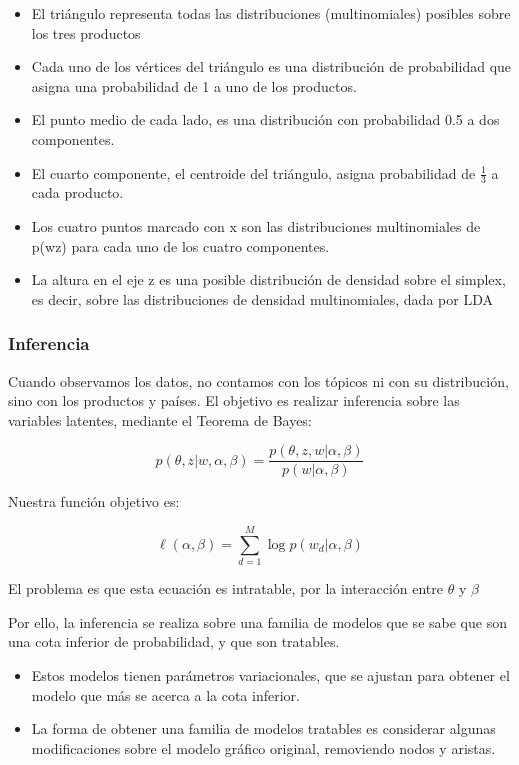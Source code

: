 \documentclass[class=article, crop=false]{standalone}
\begin{document}
\begin{itemize}
\item
El triángulo representa todas las distribuciones (multinomiales)
posibles sobre los tres productos
\item
Cada uno de los vértices del triángulo es una distribución de
probabilidad que asigna una probabilidad de 1 a uno de los productos.
\item
El punto medio de cada lado, es una distribución con probabilidad 0.5
a dos componentes.
\item
El cuarto componente, el centroide del triángulo, asigna probabilidad
de \(\frac{1}{3}\) a cada producto.
\item
Los cuatro puntos marcado con x son las distribuciones multinomiales
de p(w\textbar{}z) para cada uno de los cuatro componentes.
\item
La altura en el eje z es una posible distribución de densidad sobre el
simplex, es decir, sobre las distribuciones de densidad multinomiales,
dada por LDA
\end{itemize}

\subsubsection{Inferencia}

Cuando observamos los datos, no contamos con los tópicos ni con su
distribución, sino con los productos y países. El objetivo es realizar
inferencia sobre las variables latentes, mediante el Teorema de Bayes:

\[
p(\theta,z|w,\alpha,\beta) = \frac{p(\theta,z,w|\alpha,\beta)}{p(w|\alpha,\beta)}
\]

Nuestra función objetivo es:

\[
\ell(\alpha, \beta) = \sum_{d=1}^M \log p(w_d|\alpha,\beta)
\]

El problema es que esta ecuación es intratable, por la interacción entre
\(\theta\) y \(\beta\)

Por ello, la inferencia se realiza sobre una familia de modelos que se
sabe que son una cota inferior de probabilidad, y que son tratables.

\begin{itemize}
\item
Estos modelos tienen parámetros variacionales, que se ajustan para
obtener el modelo que más se acerca a la cota inferior.
\item
La forma de obtener una familia de modelos tratables es considerar
algunas modificaciones sobre el modelo gráfico original, removiendo
nodos y aristas.
\end{itemize}
\end{document}
